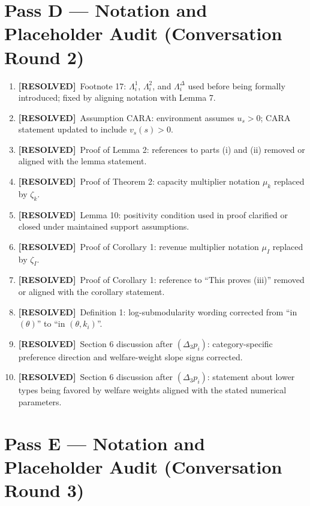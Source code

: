 \documentclass{class}
\newcommand{\ok}{\textcolor{ok}{\textbf{[RESOLVED]}}}
\begin{document}
\section*{Pass D --- Notation and Placeholder Audit (Conversation Round 2)}

\begin{enumerate}[leftmargin=1.5cm]
\item \ok\ Footnote 17: \(\Lambda_i^1\), \(\Lambda_i^2\), and \(\Lambda_i^\Delta\) used before being formally introduced; fixed by aligning notation with Lemma 7.
\item \ok\ Assumption CARA: environment assumes \(u_s>0\); CARA statement updated to include \(v_s(s)>0\).
\item \ok\ Proof of Lemma 2: references to parts (i) and (ii) removed or aligned with the lemma statement.
\item \ok\ Proof of Theorem 2: capacity multiplier notation \(\mu_k\) replaced by \(\zeta_k\).
\item \ok\ Lemma 10: positivity condition used in proof clarified or closed under maintained support assumptions.
\item \ok\ Proof of Corollary 1: revenue multiplier notation \(\mu_I\) replaced by \(\zeta_I\).
\item \ok\ Proof of Corollary 1: reference to ``This proves (iii)'' removed or aligned with the corollary statement.
\item \ok\ Definition 1: log-submodularity wording corrected from ``in \((\theta)\)'' to ``in \((\theta,k_i)\)''.
\item \ok\ Section 6 discussion after \((\Delta_3 p_i)\): category-specific preference direction and welfare-weight slope signs corrected.
\item \ok\ Section 6 discussion after \((\Delta_3 p_i)\): statement about lower types being favored by welfare weights aligned with the stated numerical parameters.
\end{enumerate}

\section*{Pass E --- Notation and Placeholder Audit (Conversation Round 3)}
\end{document}
